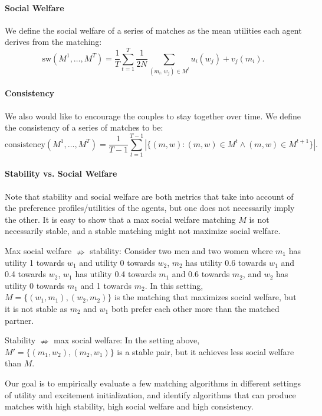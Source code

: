 \paragraph{Social Welfare} We define the social welfare of a series of matches as the mean utilities each agent derives from the matching:
\begin{equation}
    \mbox{sw}(M^1, \ldots, M^T) = \frac{1}{T}\sum_{t=1}^T{\frac{1}{2N}{\sum_{(m_i, w_j)\in M^t}{u_i(w_j) + v_j(m_i)}}}.
\end{equation}
\paragraph{Consistency} We also would like to encourage the couples to stay together over time. We define the consistency of a series of matches to be:
\begin{equation}
    \mbox{consistency}(M^1, \ldots, M^T) = \frac{1}{T-1}\sum_{t=1}^{T-1}{|\{(m, w): (m, w) \in M^t \wedge (m, w) \in M^{t+1}\}|}.
\end{equation}
\paragraph{Stability vs. Social Welfare} Note that stability and social welfare are both metrics that take into account of the preference profiles/utilities of the agents, but one does not necessarily imply the other. It is easy to show that a max social welfare matching $M$ is not necessarily stable, and a stable matching might not maximize social welfare.

Max social welfare $\nRightarrow$ stability: Consider two men and two women where $m_1$ has utility 1 towards $w_1$ and utility 0 towards $w_2$, $m_2$ has utility 0.6 towards $w_1$ and 0.4 towards $w_2$, $w_1$ has utility 0.4 towards $m_1$ and 0.6 towards $m_2$, and $w_2$ has utility 0 towards $m_1$ and 1 towards $m_2$. In this setting, $M = \{(w_1, m_1), (w_2, m_2)\}$ is the matching that maximizes social welfare, but it is not stable as $m_2$ and $w_1$ both prefer each other more than the matched partner.

Stability $\nRightarrow$ max social welfare: In the setting above, $M' = \{(m_1, w_2), (m_2, w_1)\}$ is a stable pair, but it achieves less social welfare than $M$.

Our goal is to empirically evaluate a few matching algorithms in different settings of utility and excitement initialization, and identify algorithms that can produce matches with high stability, high social welfare and high consistency.
